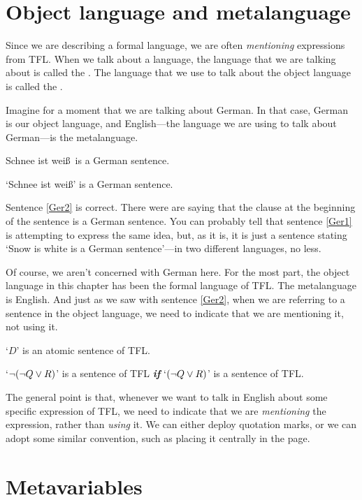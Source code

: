 \section{Object language and metalanguage}\label{s:Metalanguage}
Since we are describing a formal language, we are often \emph{mentioning} expressions from TFL. When we talk about a language, the language that we are talking about is called the . The language that we use to talk about the object language is called the .\label{def.metalanguage} 

Imagine for a moment that we are talking about German. In that case, German is our object language, and English---the language we are using to talk about German---is the metalanguage.
	\begin{earg}
		\item[\ex{Ger1}] Schnee ist wei\ss\ is a German sentence.
		\item[\ex{Ger2}]`Schnee ist wei\ss' is a German sentence.
	\end{earg}
Sentence \ref{Ger2} is correct. There were are saying that the clause at the beginning of the sentence is a German sentence. You can probably tell that sentence \ref{Ger1} is attempting to express the same idea, but, as it is, it is just a sentence stating `Snow is white is a German sentence'---in two different languages, no less. 

Of course, we aren't concerned with German here. For the most part, the object language in this chapter has been the formal language of TFL. The metalanguage is English. And just as we saw with sentence \ref{Ger2}, when we are referring to a sentence in the object language, we need to indicate that we are mentioning it, not using it. 
	\begin{earg}
		\item[\ex{obj1}] `$D$' is an atomic sentence of TFL.
		\item[\ex{obj2}] `${\neg} ({\neg} Q \vee R)$' is a sentence of TFL \textit{\textbf{if}} `$({\neg} Q \vee R)$' is a sentence of TFL.
	\end{earg}

The general point is that, whenever we want to talk in English about some specific expression of TFL, we need to indicate that we are \emph{mentioning} the expression, rather than \emph{using} it. We can either deploy quotation marks, or we can adopt some similar convention, such as  placing it centrally in the page. 


\section{Metavariables}\label{s:Metavariables}

